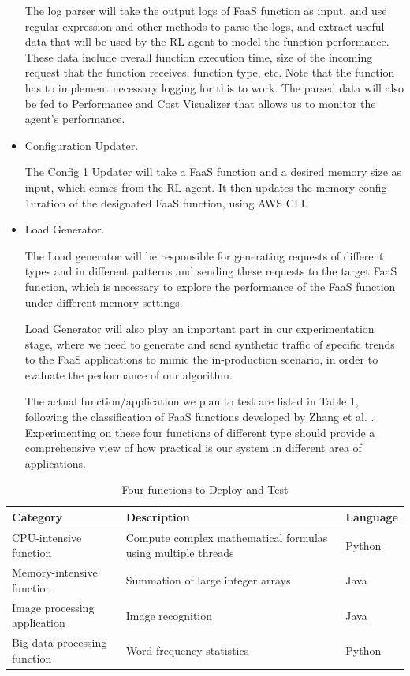 \documentclass[conference]{IEEEtran}
\begin{document}
\begin{itemize}
The log parser will take the output logs of FaaS function as input, and use regular expression and other methods to parse the logs, and extract useful data that will be used by the RL agent to model the function performance. These data include overall function execution time, size of the incoming request that the function receives, function type, etc. Note that the function has to implement necessary logging for this to work. The parsed data will also be fed to Performance and Cost Visualizer that allows us to monitor the agent's performance. 

\item Configuration Updater.

The Config 1 Updater will take a FaaS function and a desired memory size as input, which comes from the RL agent. It then updates the memory config 1uration of the designated FaaS function, using AWS CLI. 

\item Load Generator.

The Load generator will be responsible for generating requests of different types and in different patterns and sending these requests to the target FaaS function, which is necessary to explore the performance of the FaaS function under different memory settings.

Load Generator will also play an important part in our experimentation stage, where we need to generate and send synthetic traffic of specific trends to the FaaS applications to mimic the in-production scenario, in order to evaluate the performance of our algorithm.

The actual function/application we plan to test are listed in Table 1, following the classification of FaaS functions developed by Zhang et al. \cite{10.1007/978-3-030-96326-2_2}. Experimenting on these four functions of different type should provide a comprehensive view of how practical is our system in different area of applications.

\end{itemize}
\begin{table}
\centering

\begin{tabular}{| l | l | l |}
\hline
Category & Description & Language \\
\hline

\hline
CPU-intensive function & Compute complex mathematical formulas using multiple threads & Python \\
\hline
Memory-intensive function & Summation of large integer arrays & Java \\
\hline
Image processing application & Image recognition & Java \\
\hline
Big data processing function & Word frequency statistics & Python \\
\hline

\end{tabular}
\caption{Four functions to Deploy and Test}
\label{tab:enter-label}
\end{table}
\end{document}
